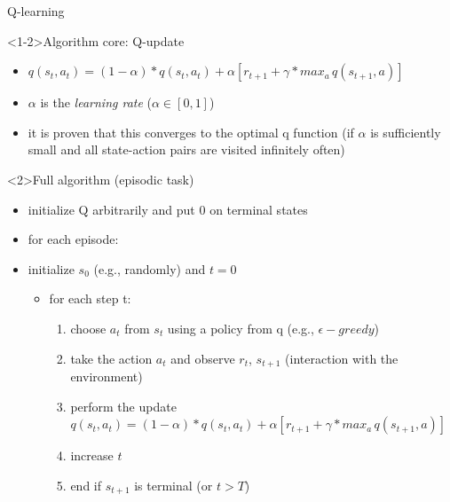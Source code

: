 \documentclass[presentation, 9pt]{beamer}\mode<presentation>{\usetheme{AMSBolognaFC}}
\begin{document}
\begin{frame}{Q-learning}
	\begin{exampleblock}<1-2>{Algorithm core: Q-update}
		\begin{itemize}
			\item $ q(s_t, a_t) = (1 - \alpha) * q(s_t, a_t) + \alpha [r_{t+1} + \gamma * max_a \, q(s_{t+1}, a)] $
			\item $\alpha$ is the \emph{learning rate} ($\alpha \in [0,1]$)
			\item it is proven that this converges to the optimal q function (if $\alpha$ is sufficiently small and all state-action pairs are visited infinitely often)
		\end{itemize}
	\end{exampleblock}
	\begin{alertblock}{Full algorithm (episodic task)}
		\begin{itemize}
			\item initialize Q arbitrarily and put 0 on terminal states
			\item for each episode:
			\item initialize $s_0$ (e.g., randomly) and $t = 0$
			\begin{itemize}
				\item for each step t:
				\begin{enumerate}
					\item choose $a_t$ from $s_t$ using a policy from q (e.g., $\epsilon-greedy$)
					\item take the action $a_t$ and observe $r_t$, $s_{t+1}$ (interaction with the environment)
					\item perform the update $q(s_t, a_t) = (1 - \alpha) * q(s_t, a_t) + \alpha [r_{t+1} + \gamma * max_a \, q(s_{t+1}, a)] $
					\item increase $t$
					\item end if $s_{t+1}$ is terminal (or $t > T$)
				\end{enumerate}
			\end{itemize}
		\end{itemize}
	\end{alertblock}
\end{frame}
\end{document}
